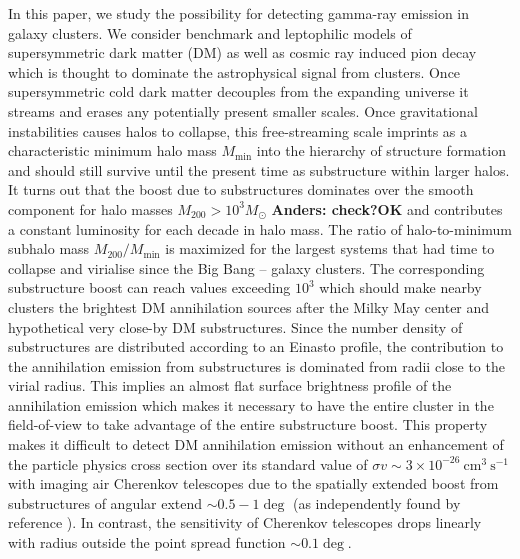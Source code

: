 \documentclass[10pt,aps,pra,reprint,amsmath,amsfonts,amssymb,showpacs,nofootinbib,floatfix]{revtex4-1}
\newcommand{\msun}{M_\odot}
\newcommand{\mvir}{M_{200}}
\begin{document}
In this paper, we study the possibility for detecting gamma-ray
emission in galaxy clusters. We consider benchmark and leptophilic
models of supersymmetric dark matter (DM) as well as cosmic ray
induced pion decay which is thought to dominate the astrophysical
signal from clusters. Once supersymmetric cold dark matter decouples
from the expanding universe it streams and erases any potentially
present smaller scales. Once gravitational instabilities causes halos
to collapse, this free-streaming scale imprints as a characteristic
minimum halo mass $M_\mathrm{min}$ into the hierarchy of structure
formation and should still survive until the present time as
substructure within larger halos. It turns out that the boost due to
substructures dominates over the smooth component for halo masses
$\mvir>10^3 \msun$ {\bf Anders: check?OK} and contributes a constant
luminosity for each decade in halo mass. The ratio of halo-to-minimum
subhalo mass $\mvir/M_\mathrm{min}$ is maximized for the largest
systems that had time to collapse and virialise since the Big Bang --
galaxy clusters. The corresponding substructure boost can reach values
exceeding $10^3$ which should make nearby clusters the brightest DM
annihilation sources after the Milky May center and hypothetical very
close-by DM substructures. Since the number density of substructures
are distributed according to an Einasto profile, the contribution to
the annihilation emission from substructures is dominated from radii
close to the virial radius. This implies an almost flat surface
brightness profile of the annihilation emission which makes it
necessary to have the entire cluster in the field-of-view to take
advantage of the entire substructure boost.  This property makes it
difficult to detect DM annihilation emission without an enhancement of
the particle physics cross section over its standard value of $\sigma
v\sim 3\times 10^{-26} ~\mathrm{cm}^3~\mathrm{s}^{-1}$ with imaging
air Cherenkov telescopes due to the spatially extended boost from
substructures of angular extend $\sim 0.5-1\deg$ (as independently
found by reference \cite{2011arXiv1104.3530S}). In contrast, the
sensitivity of Cherenkov telescopes drops linearly with radius outside
the point spread function $\sim0.1\deg$.
\end{document}
